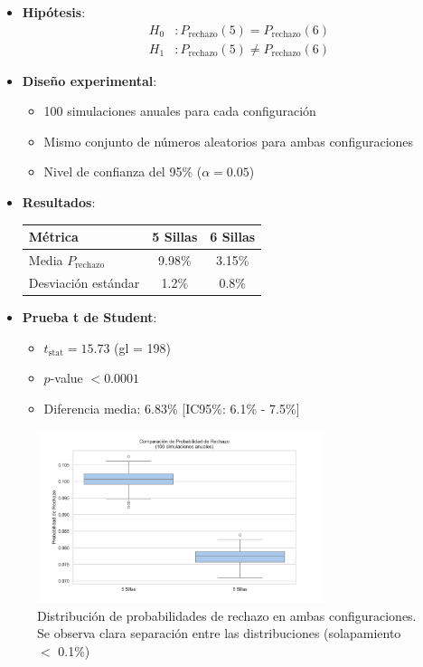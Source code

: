 \documentclass{article}
\begin{document}
\begin{itemize}
    \item \textbf{Hipótesis}:
    \begin{align*}
        H_0&: P_{\text{rechazo}}(5) = P_{\text{rechazo}}(6) \\
        H_1&: P_{\text{rechazo}}(5) \ne P_{\text{rechazo}}(6)
    \end{align*}
    
    \item \textbf{Diseño experimental}:
    \begin{itemize}
        \item 100 simulaciones anuales para cada configuración
        \item Mismo conjunto de números aleatorios para ambas configuraciones
        \item Nivel de confianza del 95\% ($\alpha = 0.05$)
    \end{itemize}
    
    \item \textbf{Resultados}:
    \begin{table}[H]
        \centering
        \begin{tabular}{lcc}
            \toprule
            Métrica & 5 Sillas & 6 Sillas \\
            \midrule
            Media $P_{\text{rechazo}}$ & 9.98\% & 3.15\% \\
            Desviación estándar & 1.2\% & 0.8\% \\
            \bottomrule
        \end{tabular}
    \end{table}
    
    \item \textbf{Prueba t de Student}:
    \begin{itemize}
        \item $t_{\text{stat}} = 15.73$ (gl = 198)
        \item $p$-value $< 0.0001$
        \item Diferencia media: 6.83\% [IC95\%: 6.1\% - 7.5\%]
    \end{itemize}
\end{itemize}

\begin{figure}[H]
    \centering
    \includegraphics[width=0.75\textwidth]{../images/hipotesis_rechazo.png}
    \caption{Distribución de probabilidades de rechazo en ambas configuraciones. Se observa clara separación entre las distribuciones (solapamiento $<$ 0.1\%)}
    \label{fig:hipotesis}
\end{figure}
\end{document}
